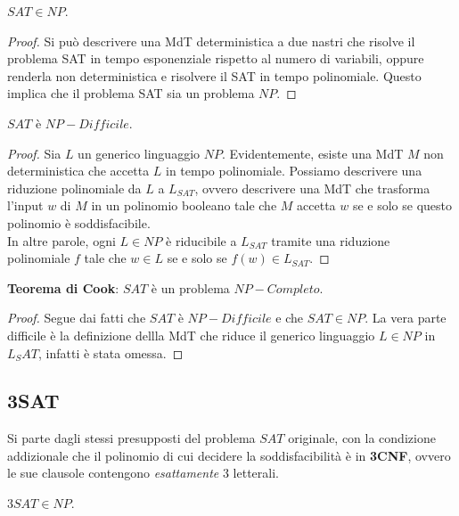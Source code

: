 \begin{lemm}
	$SAT \in NP$.
\end{lemm}

\begin{proof}
	Si può descrivere una MdT deterministica a due nastri che risolve il problema SAT in tempo esponenziale rispetto al numero di variabili, oppure renderla non deterministica e risolvere il SAT in tempo polinomiale. Questo implica che il problema SAT sia un problema $NP$.
\end{proof}

\vspace{0.4cm}

\begin{lemm}
	$SAT$ è $NP-Difficile$.
\end{lemm}

\begin{proof}
	Sia $L$ un generico linguaggio $NP$. Evidentemente, esiste una MdT $M$ non deterministica che accetta $L$ in tempo polinomiale. Possiamo descrivere una riduzione polinomiale da $L$ a $L_{SAT}$, ovvero descrivere una MdT che trasforma l'input $w$ di $M$ in un polinomio booleano tale che $M$ accetta $w$ se e solo se questo polinomio è soddisfacibile. \\ In altre parole, ogni $L \in NP$ è riducibile a $L_{SAT}$ tramite una riduzione polinomiale $f$ tale che $w \in L$ se e solo se $f(w) \in L_{SAT}$.
\end{proof}

\vspace{0.4cm}

\begin{lemm}
	\textbf{Teorema di Cook}: $SAT$ è un problema $NP-Completo$.
\end{lemm}

\begin{proof}
	Segue dai fatti che $SAT$ è $NP-Difficile$ e che $SAT \in NP$. La vera parte difficile è la definizione dellla MdT che riduce il generico linguaggio $L \in NP$ in $L_SAT$, infatti è stata omessa.
\end{proof}

\subsection{3SAT}

Si parte dagli stessi presupposti del problema $SAT$ originale, con la condizione addizionale che il polinomio di cui decidere la soddisfacibilità è in \textbf{3CNF}, ovvero le sue clausole contengono \textit{esattamente} 3 letterali.

\begin{lemm}
  $3SAT \in NP$.
\end{lemm}
